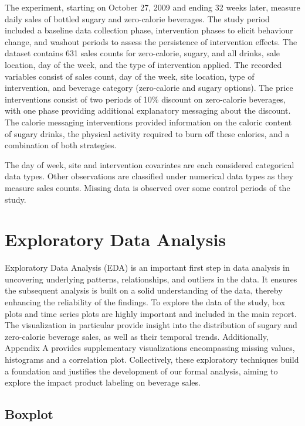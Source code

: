 \documentclass[
]{article}
\begin{document}
The experiment, starting on October 27, 2009 and ending 32 weeks later, measure daily sales of bottled sugary and zero-calorie beverages. The study period included a baseline data collection phase, intervention phases to elicit behaviour change, and washout periods to assess the persistence of intervention effects. The dataset contains 631 sales counts for zero-calorie, sugary, and all drinks, sale location, day of the week, and the type of intervention applied. The recorded variables consist of sales count, day of the week, site location, type of intervention, and beverage category (zero-calorie and sugary options). The price interventions consist of two periods of 10\% discount on zero-calorie beverages, with one phase providing additional explanatory messaging about the discount. The calorie messaging interventions provided information on the caloric content of sugary drinks, the physical activity required to burn off these calories, and a combination of both strategies.

The day of week, site and intervention covariates are each considered categorical data types. Other observations are classified under numerical data types as they measure sales counts. Missing data is observed over some control periods of the study.

\hypertarget{exploratory-data-analysis}{%
\section{Exploratory Data Analysis}\label{exploratory-data-analysis}}

Exploratory Data Analysis (EDA) is an important first step in data analysis in uncovering underlying patterns, relationships, and outliers in the data. It ensures the subsequent analysis is built on a solid understanding of the data, thereby enhancing the reliability of the findings. To explore the data of the study, box plots and time series plots are highly important and included in the main report. The visualization in particular provide insight into the distribution of sugary and zero-calorie beverage sales, as well as their temporal trends. Additionally, Appendix A provides supplementary visualizations encompassing missing values, histograms and a correlation plot. Collectively, these exploratory techniques build a foundation and justifies the development of our formal analysis, aiming to explore the impact product labeling on beverage sales.

\hypertarget{boxplot}{%
\subsection{Boxplot}\label{boxplot}}
\end{document}
